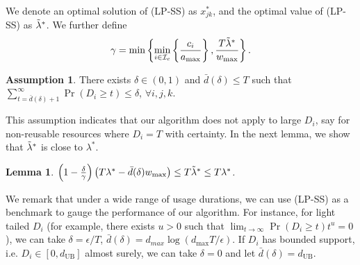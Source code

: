 \documentclass[letterpaper, 10 pt, conference]{ieeeconf}  %
\newcommand{\III}{\mathcal{I}}
\theoremstyle{plain}
\newtheorem{lemma}{Lemma}
\theoremstyle{definition}
\newtheorem{assumption}{Assumption}
\theoremstyle{remark}
\begin{document}
We denote an optimal solution of (LP-SS) as $x^*_{jk}$, and the optimal value of (LP-SS) as $\Tilde{\lambda}^*$. We further define $$\gamma=\min\left\{\min_{i\in \III_c}\left\{\frac{c_i}{a_{\max}}\right\}, \frac{T\Tilde{\lambda}^*}{w_{\max}}\right\}.$$ 
\begin{assumption}\label{asp:dur}
There exists $\delta\in (0,1)$ and $\bar{d}(\delta) \leq T$  such that $\sum^{\infty}_{t=\bar{d}(\delta)+1} \Pr(D_i \geq t) \leq \delta$, $\forall i,j,k$.  
\end{assumption}
This assumption indicates that our algorithm does not apply to large $D_i$, say for non-reusable resources where $D_i=T$ with certainty. In the next lemma, we show that $\Tilde{\lambda}^*$ is close to $\lambda^*$. 
\begin{lemma}\label{olem:3.2}
$ \left(1 - \frac{\delta}{\gamma}\right) \left(T \lambda^* - \bar{d}(\delta) w_{\max}\right) \leq T \Tilde{\lambda}^* \leq T \lambda^*$.
\end{lemma}
We remark that under a wide range of usage durations, we can use (LP-SS) as a benchmark to gauge the performance of our algorithm. For instance, for light tailed $D_i$ (for example, there exists $u>0$ such that $\lim_{t \rightarrow \infty} \Pr(D_i \geq t) t^u = 0$), we can take $\delta= \epsilon / T$, $\bar{d}(\delta) = d_{max} \log (d_{\max} T /\epsilon )$. If $D_i$ has bounded support, i.e. $D_i \in [0,d_{\text{UB}}]$ almost surely, we can take $\delta=0$ and let $\bar{d}(\delta)=d_{\text{UB}}$.
\end{document}
